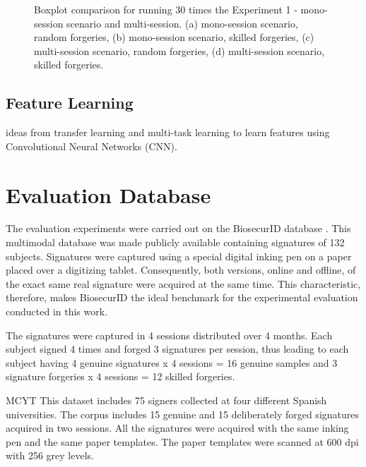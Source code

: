 \begin{figure*}[!htb]
\centering
\hspace*{0.5in} %

\caption{Boxplot comparison for running 30 times the Experiment 1 - mono-session scenario and multi-session. (a) mono-session scenario, random forgeries, (b) mono-session scenario, skilled forgeries, (c) multi-session scenario, random forgeries, (d) multi-session scenario, skilled forgeries. } \label{fig:box_exp1}
\end{figure*}

\subsection {Feature Learning} 
ideas from transfer learning and multi-task learning to learn features using Convolutional Neural Networks (CNN).

\section{Evaluation Database}


The evaluation experiments were carried out on the BiosecurID
database \cite{biosecurid}. This multimodal database was made publicly available containing signatures of 132 subjects. Signatures were
captured using a special digital inking pen on a paper placed
over a digitizing tablet. Consequently, both versions, online and
offline, of the exact same real signature were acquired at
the same time. This characteristic, therefore, makes BiosecurID the ideal benchmark for the experimental evaluation conducted in this work.

The signatures were captured in 4 sessions
distributed over 4 months. Each subject signed 4 times and
forged 3 signatures per session, thus leading to each subject having 4 genuine signatures x 4 sessions = 16 genuine samples and 3 signature forgeries x 4 sessions = 12 skilled forgeries. 

MCYT This dataset includes 75 signers collected at four different Spanish
universities. The corpus includes 15 genuine and 15 deliberately forged signatures
acquired in two sessions. All the signatures were acquired with the same inking pen
and the same paper templates. The paper templates were scanned at 600 dpi with 256
grey levels.


